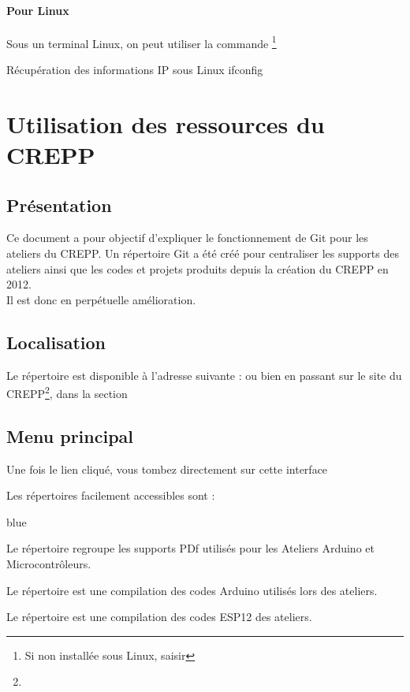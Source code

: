 {\subsubsection{Pour Linux}
Sous un terminal Linux, on peut utiliser la commande \footnote{Si non installée sous Linux, 
saisir }
\begin{Bash}{Récupération des informations IP sous Linux}
ifconfig
\end{Bash}

	
	
\chapter{Utilisation des ressources du CREPP}

\section{Présentation}

Ce document a pour objectif d'expliquer le fonctionnement de Git pour les ateliers du CREPP.
Un répertoire Git a été créé pour centraliser les supports des ateliers ainsi que les codes et projets produits depuis la création du CREPP en 2012.\\
Il est donc en perpétuelle amélioration.

\section{Localisation}
Le répertoire est disponible à l'adresse suivante :  ou bien en passant sur
 le site du CREPP\footnote{}, dans la section 


\section{Menu principal}


Une fois le lien cliqué, vous tombez directement sur cette interface 


Les répertoires facilement accessibles sont :

\begin{items}{blue}{\Bullet}
    \item Le répertoire  regroupe les supports PDf utilisés pour les Ateliers Arduino et Microcontrôleurs.
    \item Le répertoire  est une compilation des codes Arduino utilisés lors des ateliers.
    \item Le répertoire  est une compilation des codes ESP12 des ateliers.
\end{items}

}
